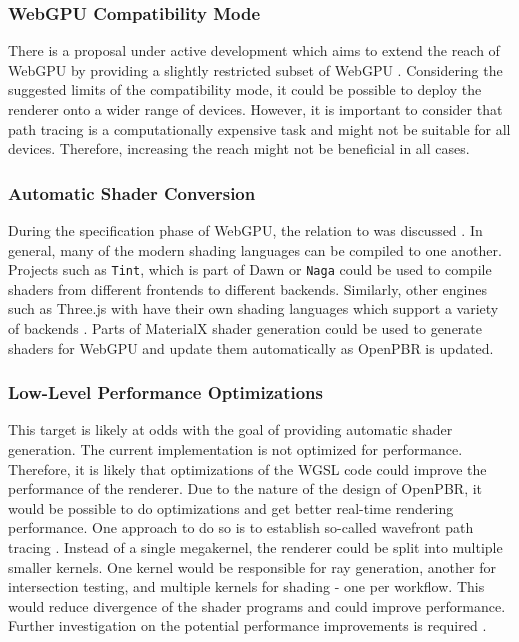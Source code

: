 \subsubsection*{WebGPU Compatibility Mode}

There is a proposal under active development which aims to extend the reach of \gls{WebGPU} by providing a slightly restricted subset of \gls{WebGPU} \cite{WebGPUCompatibilityModeProposal}. Considering the suggested limits of the compatibility mode, it could be possible to deploy the renderer onto a wider range of devices. However, it is important to consider that path tracing is a computationally expensive task and might not be suitable for all devices. Therefore, increasing the reach might not be beneficial in all cases.

\subsubsection*{Automatic Shader Conversion}

During the specification phase of \gls{WebGPU}, the relation to  was discussed \cite{webGPUSpirVRelation}. In general, many of the modern shading languages can be compiled to one another. Projects such as \texttt{Tint}, which is part of \gls{Dawn} \cite{dawnImplementation} or \texttt{Naga} \cite{nagaImplementation} could be used to compile shaders from different frontends to different backends. Similarly, other engines such as \gls{Three.js} with  have their own shading languages which support a variety of backends \cite{ThreeJSShadingLanguage}. Parts of \gls{MaterialX} shader generation could be used to generate shaders for \gls{WebGPU} and update them automatically as \gls{OpenPBR} is updated.

\subsubsection*{Low-Level Performance Optimizations}

This target is likely at odds with the goal of providing automatic shader generation. The current implementation is not optimized for performance. Therefore, it is likely that optimizations of the \gls{WGSL} code could improve the performance of the renderer. Due to the nature of the design of \gls{OpenPBR}, it would be possible to do optimizations and get better real-time rendering performance. One approach to do so is to establish so-called wavefront path tracing \cite{laine2013megakernels}. Instead of a single megakernel, the renderer could be split into multiple smaller kernels. One kernel would be responsible for ray generation, another for intersection testing, and multiple kernels for shading - one per workflow. This would reduce divergence of the shader programs and could improve performance. Further investigation on the potential performance improvements is required \cite{wavefrontComparisonInTableA5,mitsubaWavefrontVsMegakernel}.

